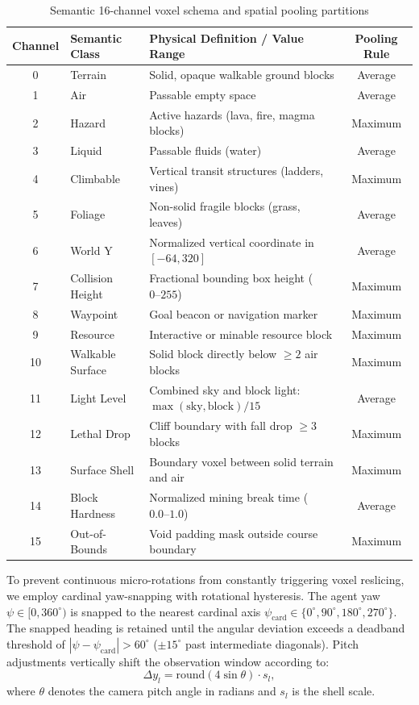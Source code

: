 \documentclass{svproc}
\begin{document}
\begin{table}[t]
\centering
\caption{Semantic 16-channel voxel schema and spatial pooling partitions}
\label{tab:schema}
\begin{tabular}{c l l c}
\toprule
\textbf{Channel} & \textbf{Semantic Class} & \textbf{Physical Definition / Value Range} & \textbf{Pooling Rule} \\
\midrule
0 & Terrain & Solid, opaque walkable ground blocks & Average \\
1 & Air & Passable empty space & Average \\
2 & Hazard & Active hazards (lava, fire, magma blocks) & Maximum \\
3 & Liquid & Passable fluids (water) & Average \\
4 & Climbable & Vertical transit structures (ladders, vines) & Maximum \\
5 & Foliage & Non-solid fragile blocks (grass, leaves) & Average \\
6 & World Y & Normalized vertical coordinate in $[-64, 320]$ & Average \\
7 & Collision Height & Fractional bounding box height ($0\text{--}255$) & Maximum \\
8 & Waypoint & Goal beacon or navigation marker & Maximum \\
9 & Resource & Interactive or minable resource block & Maximum \\
10 & Walkable Surface & Solid block directly below $\ge 2$ air blocks & Maximum \\
11 & Light Level & Combined sky and block light: $\max(\text{sky}, \text{block})/15$ & Average \\
12 & Lethal Drop & Cliff boundary with fall drop $\ge 3$ blocks & Maximum \\
13 & Surface Shell & Boundary voxel between solid terrain and air & Maximum \\
14 & Block Hardness & Normalized mining break time ($0.0\text{--}1.0$) & Average \\
15 & Out-of-Bounds & Void padding mask outside course boundary & Maximum \\
\bottomrule
\end{tabular}
\end{table}

To prevent continuous micro-rotations from constantly triggering voxel reslicing, we employ cardinal yaw-snapping with rotational hysteresis. The agent yaw $\psi \in [0, 360^\circ)$ is snapped to the nearest cardinal axis $\psi_{\text{card}} \in \{0^\circ, 90^\circ, 180^\circ, 270^\circ\}$. The snapped heading is retained until the angular deviation exceeds a deadband threshold of $|\psi - \psi_{\text{card}}| > 60^\circ$ ($\pm 15^\circ$ past intermediate diagonals). Pitch adjustments vertically shift the observation window according to:
\begin{equation}
\Delta y_l = \mathrm{round}\left(4 \sin \theta\right) \cdot s_l,
\end{equation}
where $\theta$ denotes the camera pitch angle in radians and $s_l$ is the shell scale. 
\end{document}
